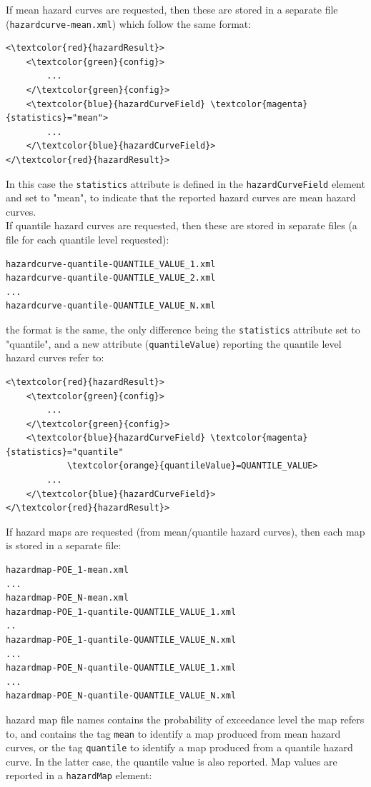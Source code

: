 If mean hazard curves are requested, then these are stored in a separate file (\Verb+hazardcurve-mean.xml+) which follow the same format:
\begin{Verbatim}[frame=single, commandchars=\\\{\}, samepage=true]
<\textcolor{red}{hazardResult}>
	<\textcolor{green}{config}>
		...
	</\textcolor{green}{config}>
	<\textcolor{blue}{hazardCurveField} \textcolor{magenta}{statistics}="mean">
		...
	</\textcolor{blue}{hazardCurveField}>
</\textcolor{red}{hazardResult}>
\end{Verbatim}
In this case the \Verb+statistics+ attribute is defined in the \Verb+hazardCurveField+ element and set to "mean", to indicate that the reported hazard curves are mean hazard curves.\\
If quantile hazard curves are requested, then these are stored in separate files (a file for each quantile level requested):
\begin{Verbatim}[frame=single, commandchars=\\\{\}, samepage=true]
hazardcurve-quantile-QUANTILE_VALUE_1.xml
hazardcurve-quantile-QUANTILE_VALUE_2.xml
...
hazardcurve-quantile-QUANTILE_VALUE_N.xml
\end{Verbatim}
the format is the same, the only difference being the \Verb+statistics+ attribute set to "quantile", and a new attribute (\Verb+quantileValue+) reporting the quantile level hazard curves refer to:
\begin{Verbatim}[frame=single, commandchars=\\\{\}, samepage=true]
<\textcolor{red}{hazardResult}>
	<\textcolor{green}{config}>
		...
	</\textcolor{green}{config}>
	<\textcolor{blue}{hazardCurveField} \textcolor{magenta}{statistics}="quantile"
			\textcolor{orange}{quantileValue}=QUANTILE_VALUE>
		...
	</\textcolor{blue}{hazardCurveField}>
</\textcolor{red}{hazardResult}>
\end{Verbatim}
If hazard maps are requested (from mean/quantile hazard curves), then each map is stored in a separate file:
\begin{Verbatim}[frame=single, commandchars=\\\{\}, samepage=true]
hazardmap-POE_1-mean.xml
...
hazardmap-POE_N-mean.xml
hazardmap-POE_1-quantile-QUANTILE_VALUE_1.xml
..
hazardmap-POE_1-quantile-QUANTILE_VALUE_N.xml
...
hazardmap-POE_N-quantile-QUANTILE_VALUE_1.xml
...
hazardmap-POE_N-quantile-QUANTILE_VALUE_N.xml
\end{Verbatim}
hazard map file names contains the probability of exceedance level the map refers to, and contains the tag \Verb+mean+ to identify a map produced from mean hazard curves, or the tag \Verb+quantile+ to identify a map produced from a quantile hazard curve. In the latter case, the quantile value is also reported. Map values are reported in a \Verb+hazardMap+ element:
